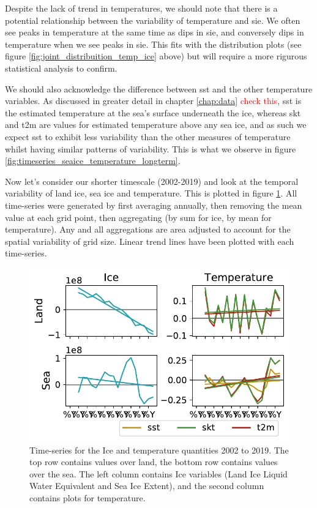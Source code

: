\documentclass[../main.tex]{subfiles}
\begin{document}
Despite the lack of trend in temperatures, we should note that there is a potential relationship between the variability of temperature and \gls{sie}. We often see peaks in temperature at the same time as dips in \gls{sie}, and conversely dips in temperature when we see peaks in \gls{sie}. This fits with the distribution plots (see figure \ref{fig:joint_distribuition_temp_ice} above) but will require a more rigurous statistical analysis to confirm.

We should also acknowledge the difference between \gls{sst} and the other temperature variables. As discussed in greater detail in chapter \ref{chap:data} \textcolor{red}{check this}, \gls{sst} is the estimated temperature at the sea's surface underneath the ice, whereas \gls{skt} and \gls{t2m} are values for estimated temperature above any sea ice, and as such we expect \gls{sst} to exhibit less variability than the other measures of temperature whilst having similar patterns of variability. This is what we observe in figure \ref{fig:timeseries_seaice_temperature_longterm}. 

Now let's consider our shorter timescale (2002-2019) and look at the temporal variability of land ice, sea ice and temperature. This is plotted in figure \ref{fig:timeseries_seaice_temperature_shortterm}. All time-series were generated by first averaging annually, then removing the mean value at each grid point, then aggregating (by sum for ice, by mean for temperature). Any and all aggregations are area adjusted to account for the spatial variability of grid size. Linear trend lines have been plotted with each time-series.
\begin{figure}[ht!]
    \centering
    \includegraphics{images/week8/hres/six_timeseries}
    \caption{Time-series for the Ice and temperature quantities 2002 to 2019. The top row contains values over land, the bottom row contains values over the sea. The left column contains Ice variables (Land Ice Liquid Water Equivalent and Sea Ice Extent), and the second column contains plots for temperature. }
    \label{fig:timeseries_seaice_temperature_shortterm}
\end{figure}
\end{document}
